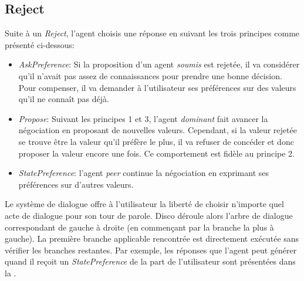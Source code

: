 		\subsection{Reject}
			Suite à un \emph{Reject}, l'agent choisis une réponse en suivant les trois principes comme présenté ci-dessous:
			\begin{itemize}
				\item \emph{AskPreference}: Si la proposition d'un agent \emph{soumis} est rejetée, il va considérer qu'il n'avait pas assez de connaissances pour prendre une bonne décision. Pour compenser, il va demander à l'utilisateur ses préférences sur des valeurs qu'il ne connaît pas déjà. 
				
				\item \emph{Propose}: Suivant les principes 1 et 3, l'agent \emph{dominant} fait avancer la négociation en proposant de nouvelles valeurs. Cependant, si la valeur rejetée se trouve être la valeur qu'il préfère le plus, il va refuser de concéder et donc proposer la valeur encore une fois. Ce comportement est fidèle au principe 2. 
				
				\item \emph{StatePreference}: l'agent \emph{peer} continue la négociation en exprimant ses préférences sur d'autres valeurs. 
			
				
			\end{itemize}	
			Le système de dialogue offre à l'utilisateur la liberté de choisir n'importe quel acte de dialogue pour son tour de parole. Disco déroule alors l'arbre de dialogue correspondant de gauche à droite (en commençant par la branche la plus à gauche). La première branche applicable rencontrée est directement exécutée sans vérifier les branches restantes.
		Par exemple, les réponses que l'agent peut générer quand il reçoit un \emph{StatePreference} de la part de l'utilisateur sont présentées dans la .
	
	
	
	